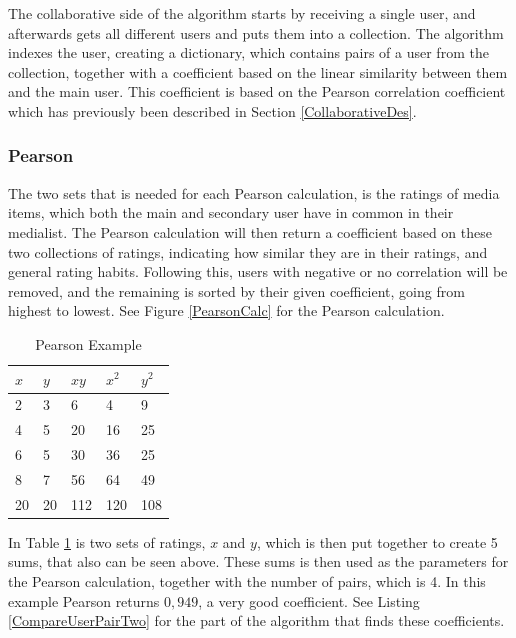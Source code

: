 The collaborative side of the algorithm starts by receiving a single user, and afterwards gets all different users and puts them into a collection. The algorithm indexes the user, creating a dictionary, which contains pairs of a user from the collection, together with a coefficient based on the linear similarity between them and the main user. This coefficient is based on the Pearson correlation coefficient which has previously been described in Section \ref{CollaborativeDes}.

\subsubsection{Pearson}

The two sets that is needed for each Pearson calculation, is the ratings of media items, which both the main and secondary user have in common in their medialist. The Pearson calculation will then return a coefficient based on these two collections of ratings, indicating how similar they are in their ratings, and general rating habits. Following this, users with negative or no correlation will be removed, and the remaining is sorted by their given coefficient, going from highest to lowest. See Figure \ref{PearsonCalc} for the Pearson calculation.

\begin{table}[htb]
\centering
\begin{tabular}{|l|l|l|l|l|} \hline
	\textbf{$x$} & \textbf{$y$} & \textbf{$xy$}
	& \textbf{$x^2$} & \textbf{$y^2$} \\ \hline
	2 & 3 & 6 & 4 & 9 \\ \hline
	4 & 5 & 20 & 16 & 25 \\ \hline
	6 & 5 & 30 & 36 & 25 \\ \hline
	8 & 7 & 56 & 64 & 49 \\ \hline\hline
	20 & 20 & 112 & 120 & 108 \\ \hline
\end{tabular}
\caption{Pearson Example}
\label{PearsonEx}
\end{table} 

In Table \ref{PearsonEx} is two sets of ratings, $x$ and $y$, which is then put together to create 5 sums, that also can be seen above. These sums is then used as the parameters for the Pearson calculation, together with the number of pairs, which is 4. In this example Pearson returns $0,949$, a very good coefficient. See Listing \ref{CompareUserPairTwo} for the part of the algorithm that finds these coefficients.

